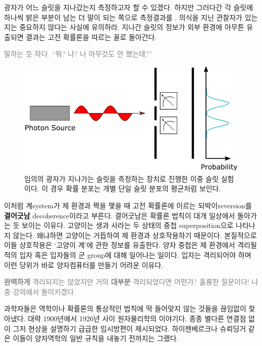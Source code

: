 \documentclass[a4paper,chapter,kosection,atbegshi,hidelinks,itemph]{oblivoir}
\begin{document}
\newpage

광자가 어느 슬릿을 지나갔는지 측정하고자 할 수 있겠다. 하지만 그러다간 각 슬릿에
하나씩 밝은 부분이 남는 더 말이 되는 쪽으로 측정결과를 . 
의식을 지닌 관찰자가 있는지는 중요하지 않다는 사실에 유의하라. 지나간 슬릿의
정보가 외부 환경에 아무튼 유출되면 결과는 고전 확률론을 따르는 꼴로 돌아간다. 

\hfill

\hfill\parbox[t]{9cm}{\textcolor{gray}{ 말하는 듯 하다. ``뭐? 나? 나 아무것도 안 했는데?''}}

\hfill

\begin{figure}[h]
  \centering
  \includegraphics[width=.8\textwidth]{iqis1_007}
  \caption{\label{fig:figure24}임의의 광자가 지나가는 슬릿을 측정하는 장치로
    진행한 이중 슬릿 실험이다. 이 경우 확률 분포는 개별 단일 슬릿 분포의 평균처럼
  보인다.}
\end{figure}

이처럼 계{\footnotesize system}가 제 환경과 짝을 맺을 때 고전 확률론에 이르는
되박이{\footnotesize reversion}를 \textbf{결어긋남}{\footnotesize
decoherence}이라고 부른다. 결어긋남은 확률론 법칙이 대개 일상에서 돌아가는 듯
보이는 이유다. 고양이는 생과 사라는 두 상태의 중첩{\footnotesize
superposition}으로 나타나지 않는다. 왜냐하면 고양이는 거듭하여 제 환경과
상호작용하기 때문이다. 본질적으로 이들 상호작용은 `고양이 계'에 관한 정보를
유출한다. 양자 중첩은 제 환경에서 격리될 적의 입자 혹은 입자들의 군{\footnotesize
group}에 대해 일어나는 일이다. 입자는 격리되어야 하며 이런 당위가 바로
양자컴퓨터를 만들기 어려운 이유다.

\hfill

\hfill\parbox[t]{9cm}{\textcolor{gray}{ \textbf{완벽하게}
격리되지는 않았지만 거의 \textbf{대부분} 격리되었다면 어떤가? 훌륭한 질문이다!
나중 강의에서 돌이키겠다.}}

\hfill\break

과학자들은 역학이나 확률론의 통상적인 법칙에 딱 들어맞지 않는 것들을 끊임없이
찾아냈다. 대략 1900년에서 1926년 사이 원자물리학의 이야기다. 종종 별다른 연결점
없이 그저 현상을 설명하기 급급한 임시방편이 제시되었다. 하이젠베르크나 슈뢰딩거
같은 이들이 양자역학의 일반 규칙을 내놓기 전까지는 그랬다. 
\end{document}
